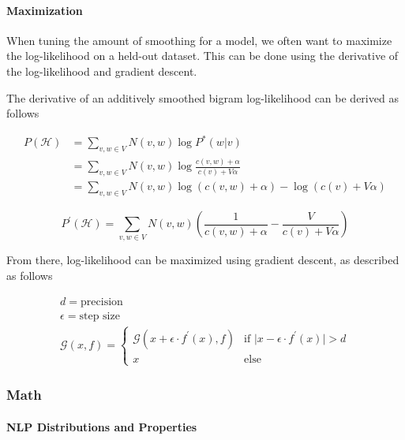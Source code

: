 \documentclass[11pt]{article}
\begin{document}
\paragraph{Maximization}

When tuning the amount of smoothing for a model, we often want to maximize the log-likelihood on a held-out dataset. This can be done using the derivative of the log-likelihood and gradient descent.

The derivative of an additively smoothed bigram log-likelihood can be derived as follows

\begin{align}
P\left(\mathcal{H}\right) &= \sum\limits_{v, w \in V} N\left(v, w\right) \log P^*\left(w \vert v\right) \\
&= \sum\limits_{v, w \in V} N\left(v, w\right) \log \frac{c\left(v, w\right) + \alpha}{c\left(v\right) + V\alpha} \\
&= \sum\limits_{v, w \in V} N\left(v, w\right) \log\left(c\left(v, w\right) + \alpha\right) - \log\left( c\left(v\right) + V\alpha \right)
\end{align}

$$ P^\prime\left(\mathcal{H}\right) = \sum\limits_{v, w \in V} N\left(v, w\right) \left(\frac{1}{c\left(v, w\right) + \alpha} - \frac{V}{c\left(v\right) + V\alpha }\right) $$

From there, log-likelihood can be maximized using gradient descent, as described as follows

\begin{gather*}
d = \text{precision} \\
\epsilon = \text{step size} \\
\mathcal{G}\left(x, f \right) =
\begin{cases}
\mathcal{G}\left(x + \epsilon \cdot f^\prime\left(x\right), f \right) & \text{if } \vert x - \epsilon \cdot f^\prime\left(x\right) \vert > d \\
x & \text{else}
\end{cases}
\end{gather*}

\subsubsection{Math}

\paragraph{NLP Distributions and Properties}
\end{document}
